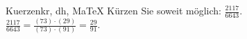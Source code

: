 \begin{MAufgabe}{Kuerzen}{kr, dh, MaTeX}
K\"urzen Sie soweit m\"oglich: $\frac{2117}{6643}$.\\ 
\ifLsg\MLoesung
\quad $\frac{2117}{6643}=\frac{(73)\cdot(29)}{(73)\cdot(91)}=\frac{29}{91}$.\else\relax\fi
 \end{MAufgabe}